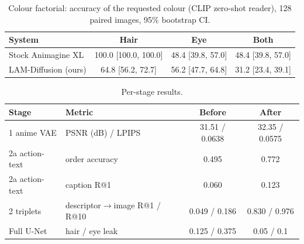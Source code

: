 \begin{table}[t]\centering
\caption{Colour factorial: accuracy of the requested colour (CLIP zero-shot reader), 128 paired images, 95\% bootstrap CI.}
\begin{tabular}{lccc}\toprule
System & Hair & Eye & Both \\ \midrule
Stock Animagine XL & 100.0 [100.0, 100.0] & 48.4 [39.8, 57.0] & 48.4 [39.8, 57.0] \\
LAM-Diffusion (ours) & 64.8 [56.2, 72.7] & 56.2 [47.7, 64.8] & 31.2 [23.4, 39.1] \\
\bottomrule\end{tabular}\end{table}

\begin{table}[t]\centering
\caption{Per-stage results.}
\begin{tabular}{llcc}\toprule
Stage & Metric & Before & After \\ \midrule
1 anime VAE & PSNR (dB) / LPIPS & 31.51 / 0.0638 & 32.35 / 0.0575 \\
2a action-text & order accuracy & 0.495 & 0.772 \\
2a action-text & caption R@1 & 0.060 & 0.123 \\
2 triplets & descriptor$\to$image R@1 / R@10 & 0.049 / 0.186 & 0.830 / 0.976 \\
Full U-Net & hair / eye leak & 0.125 / 0.375 & 0.05 / 0.1 \\
\bottomrule\end{tabular}\end{table}

